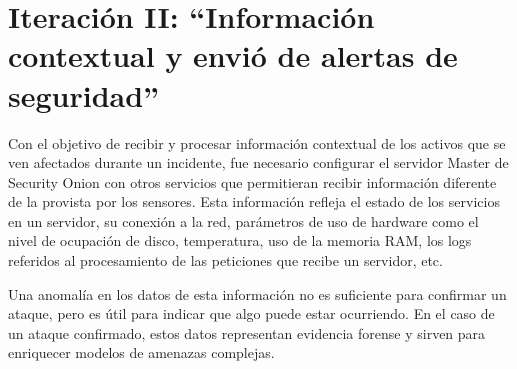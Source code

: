 \chapter{Iteración II: “Información contextual y envió de alertas de seguridad”}
    Con el objetivo de recibir y procesar información contextual de los activos que se ven afectados durante un incidente, fue necesario configurar el servidor Master de Security Onion con otros servicios que permitieran recibir información diferente de la provista por los sensores. Esta información refleja el estado de los servicios en un servidor, su conexión a la red, parámetros de uso de hardware como el nivel de ocupación de disco, temperatura, uso de la memoria RAM, los logs referidos al procesamiento de las peticiones que recibe un servidor, etc. \par
    Una anomalía en los datos de esta información no es suficiente para confirmar un ataque, pero es útil para indicar que algo puede estar ocurriendo. En el caso de un ataque confirmado, estos datos representan evidencia forense y sirven para enriquecer modelos de amenazas complejas. \par
